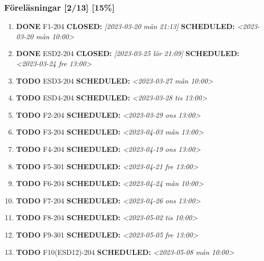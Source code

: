 \documentclass[11pt]{article}
\begin{document}
\subsubsection{Föreläsningar [2/13] [15\%]}
\label{sec:orgbc82d23}
\begin{enumerate}
\item {\bfseries\sffamily DONE} F1-204
\label{sec:org347be53}
\noindent\textbf{CLOSED:} \textit{[2023-03-20 mån 21:13] } \textbf{SCHEDULED:} \textit{<2023-03-20 mån 10:00>}\\[0pt]
\item {\bfseries\sffamily DONE} ESD2-204
\label{sec:orgdf1acd5}
\noindent\textbf{CLOSED:} \textit{[2023-03-25 lör 21:09] } \textbf{SCHEDULED:} \textit{<2023-03-24 fre 13:00>}\\[0pt]
\item {\bfseries\sffamily TODO} ESD3-204
\label{sec:orgab05be7}
\noindent\textbf{SCHEDULED:} \textit{<2023-03-27 mån 10:00>}\\[0pt]
\item {\bfseries\sffamily TODO} ESD4-204
\label{sec:orgee8aa16}
\noindent\textbf{SCHEDULED:} \textit{<2023-03-28 tis 13:00>}\\[0pt]
\item {\bfseries\sffamily TODO} F2-204
\label{sec:org8de90c8}
\noindent\textbf{SCHEDULED:} \textit{<2023-03-29 ons 13:00>}\\[0pt]
\item {\bfseries\sffamily TODO} F3-204
\label{sec:org24d6e0d}
\noindent\textbf{SCHEDULED:} \textit{<2023-04-03 mån 13:00>}\\[0pt]
\item {\bfseries\sffamily TODO} F4-204
\label{sec:orgff20ac9}
\noindent\textbf{SCHEDULED:} \textit{<2023-04-19 ons 13:00>}\\[0pt]
\item {\bfseries\sffamily TODO} F5-301
\label{sec:org4365368}
\noindent\textbf{SCHEDULED:} \textit{<2023-04-21 fre 13:00>}\\[0pt]
\item {\bfseries\sffamily TODO} F6-204
\label{sec:org2e1da25}
\noindent\textbf{SCHEDULED:} \textit{<2023-04-24 mån 10:00>}\\[0pt]
\item {\bfseries\sffamily TODO} F7-204
\label{sec:org7d3ec0c}
\noindent\textbf{SCHEDULED:} \textit{<2023-04-26 ons 13:00>}\\[0pt]
\item {\bfseries\sffamily TODO} F8-204
\label{sec:org126206f}
\noindent\textbf{SCHEDULED:} \textit{<2023-05-02 tis 10:00>}\\[0pt]
\item {\bfseries\sffamily TODO} F9-301
\label{sec:org18a61eb}
\noindent\textbf{SCHEDULED:} \textit{<2023-05-05 fre 13:00>}\\[0pt]
\item {\bfseries\sffamily TODO} F10(ESD12)-204
\label{sec:orgdc99570}
\noindent\textbf{SCHEDULED:} \textit{<2023-05-08 mån 10:00>}\\[0pt]
\end{enumerate}
\end{document}
